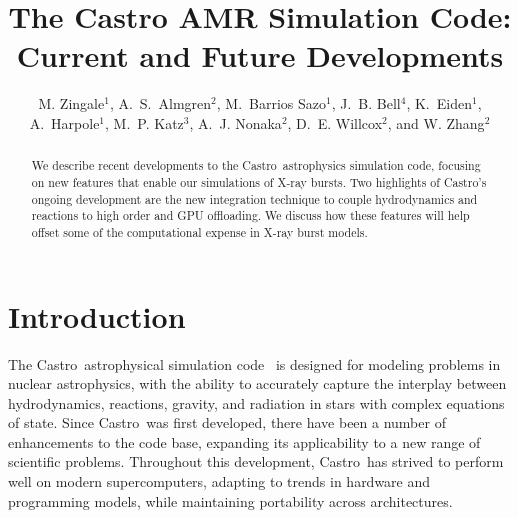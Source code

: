 \documentclass[a4paper]{jpconf}
\newcommand{\castro}{{\sffamily Castro}}
\begin{document}
\title{The Castro AMR Simulation Code: Current and Future Developments}

\author{M. Zingale$^1$,
        A.~S.~Almgren$^2$,
        M.~Barrios Sazo$^1$,
        J.~B. Bell$^4$,
        K.~Eiden$^1$,
        A.~Harpole$^1$,
        M.~P. Katz$^3$,
        A.~J. Nonaka$^2$,
        D.~E. Willcox$^2$, and
        W. Zhang$^2$}

\address{$^1$Department of Physics and Astronomy, Stony Brook
  University, Stony Brook, NY 11794-3800 USA}

\address{$^2$Center for Computational Sciences and Engineering,
  Lawrence Berkeley National Lab, Berkeley, CA 94720 USA}

\address{$^3$NVIDIA Corporation, 2788 San Tomas Expressway,
  Santa Clara, CA, 95050 USA}


\begin{abstract}
We describe recent developments to the \castro\ astrophysics
simulation code, focusing on new features that enable our simulations
of X-ray bursts.  Two highlights of \castro's ongoing development are
the new integration technique to couple hydrodynamics and reactions to
high order and GPU offloading.  We discuss how these features will
help offset some of the computational expense in X-ray burst models.
\end{abstract}



\section{Introduction}

The \castro\ astrophysical simulation code~\cite{castro} is designed
for modeling problems in nuclear astrophysics, with the ability to
accurately capture the interplay between hydrodynamics, reactions,
gravity, and radiation in stars with complex equations of state.
Since \castro\ was first developed, there have been a number of
enhancements to the code base, expanding its applicability to a new
range of scientific problems.  Throughout this development,
\castro\ has strived to perform well on modern supercomputers,
adapting to trends in hardware and programming models, while
maintaining portability across architectures.
\end{document}
